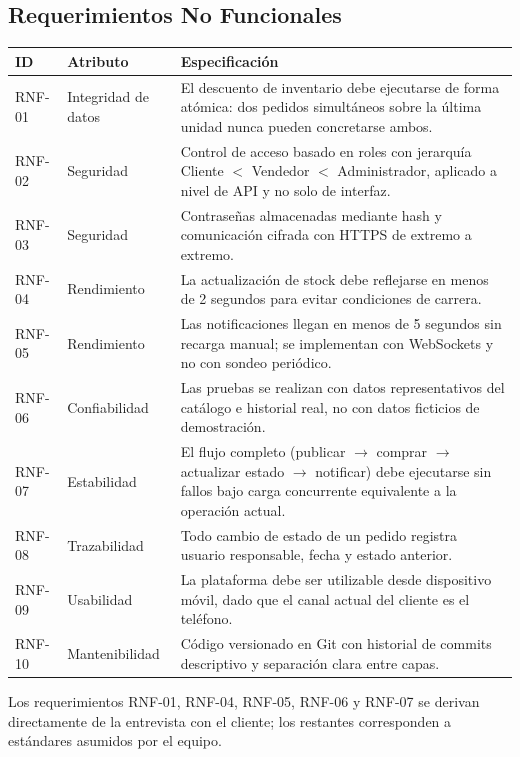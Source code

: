 \documentclass[12pt, a4paper]{article}
\begin{document}
\subsection{Requerimientos No Funcionales}
\begin{longtable}{@{}p{1.4cm}p{2.3cm}p{10.5cm}@{}}
\toprule
\textbf{ID} & \textbf{Atributo} & \textbf{Especificación} \\
\midrule
\endhead
RNF-01 & Integridad de datos & El descuento de inventario debe ejecutarse de forma atómica: dos pedidos simultáneos sobre la última unidad nunca pueden concretarse ambos. \\
RNF-02 & Seguridad & Control de acceso basado en roles con jerarquía Cliente $<$ Vendedor $<$ Administrador, aplicado a nivel de API y no solo de interfaz. \\
RNF-03 & Seguridad & Contraseñas almacenadas mediante hash y comunicación cifrada con HTTPS de extremo a extremo. \\
RNF-04 & Rendimiento & La actualización de stock debe reflejarse en menos de 2 segundos para evitar condiciones de carrera. \\
RNF-05 & Rendimiento & Las notificaciones llegan en menos de 5 segundos sin recarga manual; se implementan con WebSockets y no con sondeo periódico. \\
RNF-06 & Confiabilidad & Las pruebas se realizan con datos representativos del catálogo e historial real, no con datos ficticios de demostración. \\
RNF-07 & Estabilidad & El flujo completo (publicar $\rightarrow$ comprar $\rightarrow$ actualizar estado $\rightarrow$ notificar) debe ejecutarse sin fallos bajo carga concurrente equivalente a la operación actual. \\
RNF-08 & Trazabilidad & Todo cambio de estado de un pedido registra usuario responsable, fecha y estado anterior. \\
RNF-09 & Usabilidad & La plataforma debe ser utilizable desde dispositivo móvil, dado que el canal actual del cliente es el teléfono. \\
RNF-10 & Mantenibilidad & Código versionado en Git con historial de commits descriptivo y separación clara entre capas. \\
\bottomrule
\end{longtable}

Los requerimientos RNF-01, RNF-04, RNF-05, RNF-06 y RNF-07 se derivan directamente de la entrevista con el cliente; los restantes corresponden a estándares asumidos por el equipo.
\end{document}
